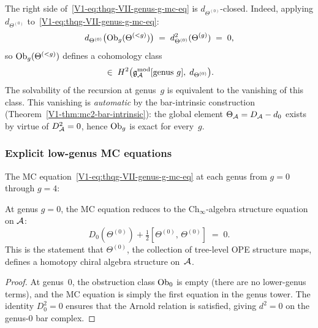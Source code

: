 \begin{remark}
The right side of~\eqref{V1-eq:thqg-VII-genus-g-mc-eq} is
$d_{\Theta^{(0)}}$-closed. Indeed, applying
$d_{\Theta^{(0)}}$ to~\eqref{V1-eq:thqg-VII-genus-g-mc-eq}:
\begin{equation}%
d_{\Theta^{(0)}}\bigl(\Ob_g(\Theta^{(<g)})\bigr)
\;=\;
d_{\Theta^{(0)}}^2(\Theta^{(g)})
\;=\; 0,
\end{equation}
so $\mathrm{Ob}_g(\Theta^{(<g)})$ defines a cohomology class
\begin{equation}%
[\Ob_g]
\;\in\;
H^2\bigl(\gAmod[\text{genus }g],\; d_{\Theta^{(0)}}\bigr).
\end{equation}
The solvability of the recursion at genus~$g$ is equivalent to
the vanishing of this class. This vanishing is \emph{automatic}
by the bar-intrinsic construction
(Theorem~\ref*{V1-thm:mc2-bar-intrinsic}): the global element
$\Theta_{\mathcal{A}} = D_{\mathcal{A}} - d_0$ exists by virtue of $D_{\mathcal{A}}^2 = 0$,
hence $\mathrm{Ob}_g$ is exact for every~$g$.
\end{remark}

\subsubsection{Explicit low-genus MC equations}

The MC equation~\eqref{V1-eq:thqg-VII-genus-g-mc-eq} at each genus
from $g = 0$ through $g = 4$:

\begin{proposition}
At genus $g = 0$, the MC equation reduces to the $\mathrm{Ch}_\infty$-algebra
structure equation on $\mathcal{A}$:
\begin{equation}%
D_0(\Theta^{(0)})
+ \tfrac{1}{2}[\Theta^{(0)},\, \Theta^{(0)}]
\;=\; 0.
\end{equation}
This is the statement that $\Theta^{(0)}$, the collection of
tree-level OPE structure maps, defines a homotopy chiral algebra
structure on~$\mathcal{A}$.
\end{proposition}

\begin{proof}
At genus~$0$, the obstruction class $\mathrm{Ob}_0$ is empty (there are no
lower-genus terms), and the MC equation is simply the first equation
in the genus tower. The identity $D_0^2 = 0$ ensures that the
Arnold relation is satisfied, giving $d^2 = 0$ on the genus-$0$
bar complex.
\end{proof}


